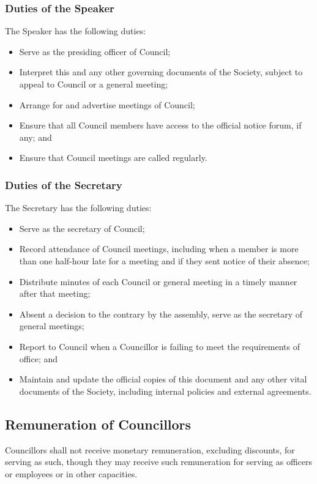 \subsubsection{Duties of the Speaker}
The Speaker has the following duties:
\begin{itemize}
  \item Serve as the presiding officer of Council;
  \item Interpret this and any other governing documents of the Society, subject
    to appeal to Council or a general meeting;
  \item Arrange for and advertise meetings of Council;
  \item Ensure that all Council members have access to the official notice
    forum, if any; and
  \item Ensure that Council meetings are called regularly.
\end{itemize}

\subsubsection{Duties of the Secretary}
The Secretary has the following duties:
\begin{itemize}
  \item Serve as the secretary of Council;
  \item Record attendance of Council meetings, including when a member is more
    than one half-hour late for a meeting and if they sent notice of their
    absence;
  \item Distribute minutes of each Council or general meeting in a timely manner
    after that meeting;
  \item Absent a decision to the contrary by the assembly, serve as the
    secretary of general meetings;
  \item Report to Council when a Councillor is failing to meet the requirements
    of office; and
  \item Maintain and update the official copies of this document and any other
    vital documents of the Society, including internal policies and external
    agreements.
\end{itemize}

\subsection{Remuneration of Councillors}
Councillors shall not receive monetary remuneration, excluding discounts, 
for serving as such, though they may receive such remuneration for serving 
as officers or employees or in other capacities.
